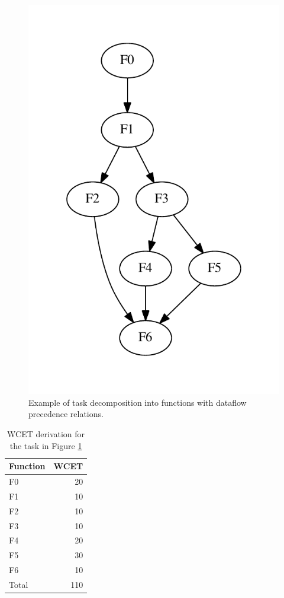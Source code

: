 \documentclass[table,11pt]{article}
\begin{document}
\begin{figure}[h]
\centering
\includegraphics[scale=0.5]{figures/complex_tg.pdf}
\caption{Example of task decomposition into functions with dataflow precedence relations.}
\label{f:complex_tg}
\end{figure}

\begin{table}
\centering
\begin{tabular}{l | r}
Function & WCET \\
\hline
F0 & 20 \\
F1 & 10 \\
F2 & 10 \\
F3 & 10 \\
F4 & 20 \\
F5 & 30 \\ 
F6 & 10 \\
\hline
Total & 110
\end{tabular}
\caption{WCET derivation for the task in Figure \ref{f:complex_tg}}
\label{t:complex_tg}
\end{table}
\end{document}
